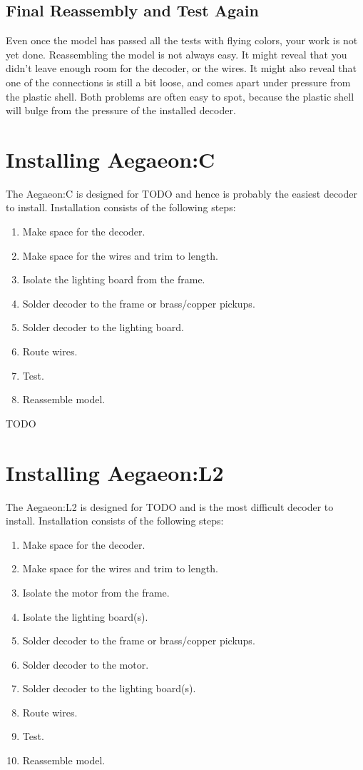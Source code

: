 \documentclass[12pt,letterpaper,draft]{memoir} %
\begin{document}
\subsection{Final Reassembly and Test Again}

Even once the model has passed all the tests with flying colors, your work is not yet done. Reassembling the model is not always easy. It might reveal that you didn't leave enough room for the decoder, or the wires. It might also reveal that one of the connections is still a bit loose, and comes apart under pressure from the plastic shell. Both problems are often easy to spot, because the plastic shell will bulge from the pressure of the installed decoder.

\section{Installing Aegaeon:C}

The Aegaeon:C is designed for TODO and hence is probably the easiest decoder to install. Installation consists of the following steps:
\begin{enumerate}
\item Make space for the decoder.
\item Make space for the wires and trim to length.
\item Isolate the lighting board from the frame.
\item Solder decoder to the frame or brass/copper pickups.
\item Solder decoder to the lighting board.
\item Route wires.
\item Test.
\item Reassemble model.
\end{enumerate}

TODO

\section{Installing Aegaeon:L2}

The Aegaeon:L2 is designed for TODO and is the most difficult decoder to install. Installation consists of the following steps:
\begin{enumerate}
\item Make space for the decoder.
\item Make space for the wires and trim to length.
\item Isolate the motor from the frame.
\item Isolate the lighting board(s).
\item Solder decoder to the frame or brass/copper pickups.
\item Solder decoder to the motor.
\item Solder decoder to the lighting board(s).
\item Route wires.
\item Test.
\item Reassemble model.
\end{enumerate}
\end{document}
